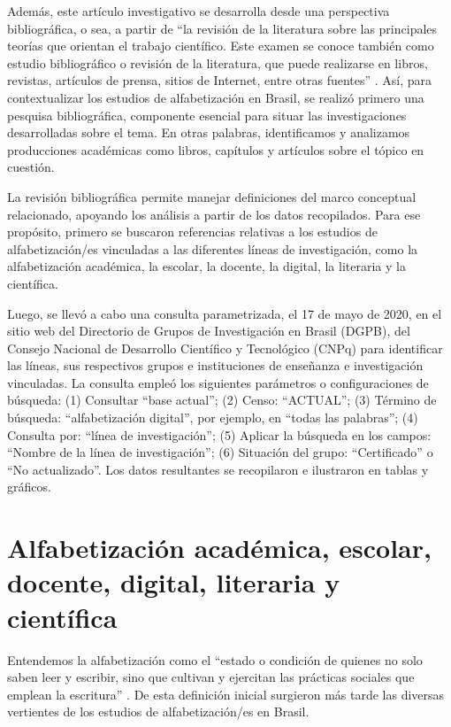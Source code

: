 \documentclass{textolivre}
\begin{document}
Además, este artículo investigativo se desarrolla desde una perspectiva bibliográfica, o sea, a partir de “la revisión de la literatura sobre las principales teorías que orientan el trabajo científico. Este examen se conoce también como estudio bibliográfico o revisión de la literatura, que puede realizarse en libros, revistas, artículos de prensa, sitios de Internet, entre otras fuentes” \cite[p. 54]{pizzani_arte_2012}. Así, para contextualizar los estudios de alfabetización en Brasil, se realizó primero una pesquisa bibliográfica, componente esencial para situar las investigaciones desarrolladas sobre el tema. En otras palabras, identificamos y analizamos producciones académicas como libros, capítulos y artículos sobre el tópico en cuestión.

La revisión bibliográfica permite manejar definiciones del marco conceptual relacionado, apoyando los análisis a partir de los datos recopilados. Para ese propósito, primero se buscaron referencias relativas a los estudios de alfabetización/es vinculadas a las diferentes líneas de investigación, como la alfabetización académica, la escolar, la docente, la digital, la literaria y la científica.

Luego, se llevó a cabo una consulta parametrizada, el 17 de mayo de 2020, en el sitio web del Directorio de Grupos de Investigación en Brasil (DGPB), del Consejo Nacional de Desarrollo Científico y Tecnológico (CNPq) para identificar las líneas, sus respectivos grupos e instituciones de enseñanza e investigación vinculadas. La consulta empleó los siguientes parámetros o configuraciones de búsqueda: (1) Consultar “base actual”; (2) Censo: “ACTUAL”; (3) Término de búsqueda: “alfabetización digital”, por ejemplo, en “todas las palabras”; (4) Consulta por: “línea de investigación”; (5) Aplicar la búsqueda en los campos: “Nombre de la línea de investigación”; (6) Situación del grupo: “Certificado” o “No actualizado”. Los datos resultantes se recopilaron e ilustraron en tablas y gráficos.

\section{Alfabetización académica, escolar, docente, digital, literaria y científica}\label{sec-alfabetizacion}
Entendemos la alfabetización como el “estado o condición de quienes no solo saben leer y escribir, sino que cultivan y ejercitan las prácticas sociales que emplean la escritura” \cite[p. 47]{soares_escolarizacao_1999}. De esta definición inicial surgieron más tarde las diversas vertientes de los estudios de alfabetización/es en Brasil.
\end{document}
